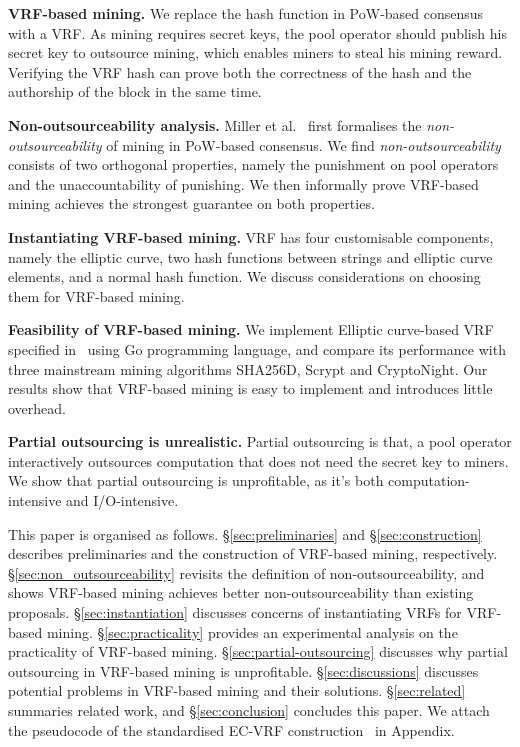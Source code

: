 \textbf{VRF-based mining.} 
We replace the hash function in PoW-based consensus with a VRF.
As mining requires secret keys, the pool operator should publish his secret key to outsource mining, which enables miners to steal his mining reward.
Verifying the VRF hash can prove both the correctness of the hash and the authorship of the block in the same time.

\textbf{Non-outsourceability analysis.}
Miller et al.~\cite{miller2015nonoutsourceable} first formalises the \emph{non-outsourceability} of mining in PoW-based consensus.
We find \emph{non-outsourceability} consists of two orthogonal properties, namely the punishment on pool operators and the unaccountability of punishing.
We then informally prove VRF-based mining achieves the strongest guarantee on both properties.

\textbf{Instantiating VRF-based mining.}
VRF has four customisable components, namely the elliptic curve, two hash functions between strings and elliptic curve elements, and a normal hash function.
We discuss considerations on choosing them for VRF-based mining.

\textbf{Feasibility of VRF-based mining.}
We implement Elliptic curve-based VRF specified in~\cite{goldberg2017draft} using Go programming language, and compare its performance with three mainstream mining algorithms SHA256D, Scrypt and CryptoNight.
Our results show that VRF-based mining is easy to implement and introduces little overhead.

\textbf{Partial outsourcing is unrealistic.}
Partial outsourcing is that, a pool operator interactively outsources computation that does not need the secret key to miners.
We show that partial outsourcing is unprofitable, as it's both computation-intensive and I/O-intensive.

This paper is organised as follows.
\S\ref{sec:preliminaries} and \S\ref{sec:construction} describes preliminaries and the construction of VRF-based mining, respectively.
\S\ref{sec:non_outsourceability} revisits the definition of non-outsourceability, and shows VRF-based mining achieves better non-outsourceability than existing proposals.
\S\ref{sec:instantiation} discusses concerns of instantiating VRFs for VRF-based mining.
\S\ref{sec:practicality} provides an experimental analysis on the practicality of VRF-based mining.
\S\ref{sec:partial-outsourcing} discusses why partial outsourcing in VRF-based mining is unprofitable.
\S\ref{sec:discussions} discusses potential problems in VRF-based mining and their solutions.
\S\ref{sec:related} summaries related work, and \S\ref{sec:conclusion} concludes this paper.
We attach the pseudocode of the standardised EC-VRF construction~\cite{goldberg2017draft} in Appendix.
